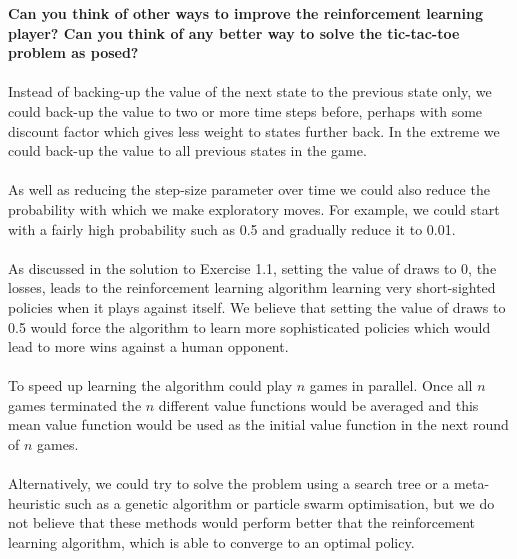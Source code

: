 \documentclass[a4paper,11pt]{article}
\numberwithin{equation}{section}
\theoremstyle{remark}
\begin{document}
\textbf{Can you think of other ways to improve the reinforcement learning player? Can you think of any better way to solve the tic-tac-toe problem as posed?}
\\ \\
Instead of backing-up the value of the next state to the previous state only, we could back-up the value to two or more time steps before, perhaps with some discount factor which gives less weight to states further back. In the extreme we could back-up the value to all previous states in the game. 
\\ \\
As well as reducing the step-size parameter over time we could also reduce the probability with which we make exploratory moves. For example, we could start with a fairly high probability such as 0.5 and gradually reduce it to 0.01.
\\ \\
As discussed in the solution to Exercise 1.1, setting the value of draws to 0, the losses, leads to the reinforcement learning algorithm learning very short-sighted policies when it plays against itself. We believe that setting the value of draws to 0.5 would force the algorithm to learn more sophisticated policies which would lead to more wins against a human opponent.
\\ \\
To speed up learning the algorithm could play $n$ games in parallel. Once all $n$ games terminated the $n$ different value functions would be averaged and this mean value function would be used as the initial value function in the next round of $n$ games.
\\ \\
Alternatively, we could try to solve the problem using a search tree or a meta-heuristic such as a genetic algorithm or particle swarm optimisation, but we do not believe that these methods would perform better that the reinforcement learning algorithm, which is able to converge to an optimal policy.
\end{document}
